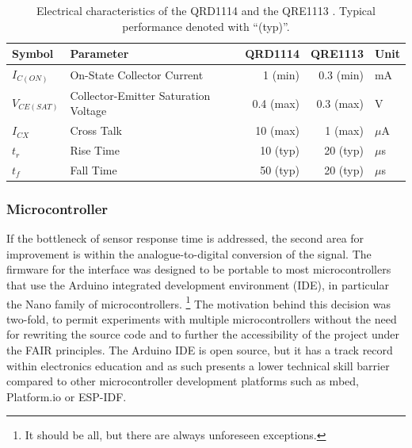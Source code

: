 \begin{table}
    \centering
    \begin{tabular}{ l l r r l}
        \hline
        \textbf{Symbol} & \textbf{Parameter}                   & \textbf{QRD1114} & \textbf{QRE1113} & \textbf{Unit} \\ \hline
        $I_{C(ON)}$     & On-State Collector Current           & 1 (min)          & 0.3 (min)        & mA            \\
        $V_{CE(SAT)}$   & Collector-Emitter Saturation Voltage & 0.4 (max)        & 0.3 (max)        & V             \\
        $I_{CX}$        & Cross Talk                           & 10 (max)         & 1   (max)        & $\mu$A        \\
        $t_r$           & Rise Time                            & 10  (typ)        & 20  (typ)        & $\mu$s        \\
        $t_f$           & Fall Time                            & 50  (typ)        & 20  (typ)        & $\mu$s        \\ \hline
    \end{tabular}
    \caption[Electrical characteristics of the QRD1114 and the
        QRE1113]{Electrical characteristics of the QRD1114
        \cite{onsemiconductor_qrd1114_2024} and the QRE1113
        \cite{onsemiconductor_qre1113_2024}. Typical performance denoted with
        ``(typ)''.}
    \label{tab:qre-vs-qrd}
\end{table}


\subsubsection{Microcontroller}

If the bottleneck of sensor response time is addressed, the second area for
improvement is within the analogue-to-digital conversion of the signal. The
firmware for the interface \cite{hamilton_firmware_2025} was designed to be
portable to most microcontrollers that use the Arduino integrated development
environment (IDE), in particular the Nano family of microcontrollers.%
\footnote{It should be all, but there are always unforeseen exceptions.}
The motivation behind this decision was two-fold, to permit experiments with
multiple microcontrollers without the need for rewriting the source code and to
further the accessibility of the project under the FAIR principles. The Arduino
IDE is open source, but it has a track record within electronics education and
as such presents a lower technical skill barrier compared to other
microcontroller development platforms such as mbed, Platform.io or ESP-IDF.

